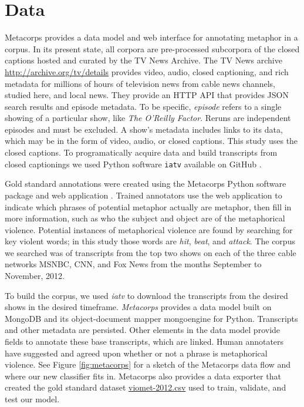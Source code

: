 \documentclass[11pt,letterpaper]{article}
\begin{document}
\section{Data}\label{data}

Metacorps provides a data model and web interface for annotating
metaphor in a corpus. In its present state, all corpora are
pre-processed subcorpora of the closed captions hosted and curated by
the TV News Archive. The TV News archive
\url{http://archive.org/tv/details} provides video, audio, closed
captioning, and rich metadata for millions of hours of television news
from cable news channels, studied here, and local news. They provide an
HTTP API that provides JSON search results and episode metadata. To be
specific, \emph{episode} refers to a single showing of a particular
show, like \emph{The O'Reilly Factor}. Reruns are independent episodes
and must be excluded. A show's metadata includes links to its data,
which may be in the form of video, audio, or closed captions. This study
uses the closed captions. To programatically acquire data and build
transcripts from closed captionings we used Python software
\texttt{iatv} available on GitHub \cite{Turner2016}.

Gold standard annotations were created using the Metacorps Python
software package and web application \cite{Turner2017}. Trained annotators
use the web application to indicate which phrases of potential metaphor
actually are metaphor, then fill in more information, such as who the
subject and object are of the metaphorical violence. Potential instances
of metaphorical violence are found by searching for key violent words;
in this study those words are \emph{hit}, \emph{beat}, and
\emph{attack}. The corpus we searched was of transcripts from the top
two shows on each of the three cable networks MSNBC, CNN, and Fox News from
the months September to November, 2012. 

To build the corpus, we used \textit{iatv} to download the transcripts from
the desired shows in the desired timeframe. \textit{Metacorps} provides 
a data model built on MongoDB and its object-document mapper mongoengine for
Python. Transcripts and other metadata are persisted. Other elements in the
data model provide fields to annotate these base transcripts, which are
linked. Human annotaters have suggested and agreed upon whether or not a
phrase is metaphorical violence. See Figure \ref{fig:metacorps} for a
sketch of the Metacorps data flow and where our new classifier fits in.
Metacorps also provides a data exporter that
created the gold standard dataset 
\href{http://metacorps.io/static/data/viomet-2012.csv}{viomet-2012.csv} used
to train, validate, and test our model.
\end{document}
